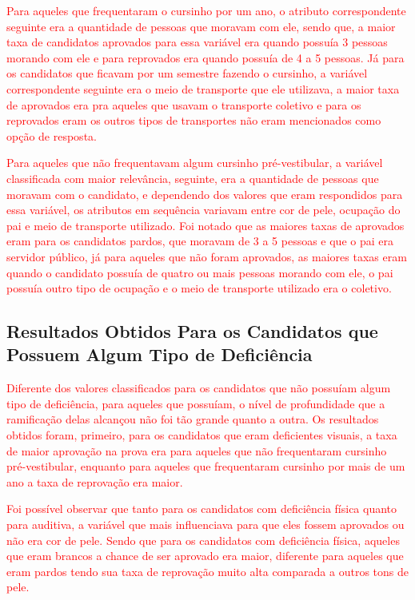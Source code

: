 \par
\textcolor{red}{Para aqueles que frequentaram o cursinho por um ano, o atributo correspondente seguinte era a quantidade de pessoas que moravam com ele, sendo que, a maior taxa de candidatos aprovados para essa variável era quando possuía 3 pessoas morando com ele e para reprovados era quando possuía de 4 a 5 pessoas. Já para os candidatos que ficavam por um semestre fazendo o cursinho, a variável correspondente seguinte era o meio de transporte que ele utilizava, a maior taxa de aprovados era pra aqueles que usavam o transporte coletivo e para os reprovados eram os outros tipos de transportes não eram mencionados como opção de resposta.}

\par
\textcolor{red}{Para aqueles que não frequentavam algum cursinho pré-vestibular, a variável classificada com maior relevância, seguinte, era a quantidade de pessoas que moravam com o candidato, e dependendo dos valores que eram respondidos para essa variável, os atributos em sequência variavam entre cor de pele, ocupação do pai e meio de transporte utilizado. Foi notado que as maiores taxas de aprovados eram para os candidatos pardos, que moravam de 3 a 5 pessoas e que o pai era servidor público, já para aqueles que não foram aprovados, as maiores taxas eram quando o candidato possuía de quatro ou mais pessoas morando com ele, o pai possuía outro tipo de ocupação e o meio de transporte utilizado era o coletivo.}


\subsection{Resultados Obtidos Para os Candidatos que Possuem Algum Tipo de Deficiência}


\par
\textcolor{red}{Diferente dos valores classificados para os candidatos que não possuíam algum tipo de deficiência, para aqueles que possuíam, o nível de profundidade que a ramificação delas alcançou não foi tão grande quanto a outra. Os resultados obtidos foram, primeiro, para os candidatos que eram deficientes visuais, a taxa de maior aprovação na prova era para aqueles que não frequentaram cursinho pré-vestibular, enquanto para aqueles que frequentaram cursinho por mais de um ano a taxa de reprovação era maior.}

\par
\textcolor{red}{Foi possível observar que tanto para os candidatos com deficiência física quanto para auditiva, a variável que mais influenciava para que eles fossem aprovados ou não era cor de pele. Sendo que para os candidatos com deficiência física, aqueles que eram brancos a chance de ser aprovado era maior, diferente para aqueles que eram pardos tendo sua taxa de reprovação muito alta comparada a outros tons de pele.}

